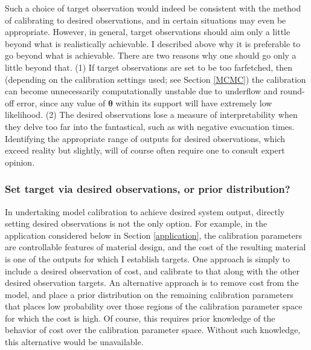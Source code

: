 \documentclass{article}
\begin{document}
Such a choice of target observation would indeed be consistent with the method of calibrating to desired observations, and in certain situations may even be appropriate. However, in general, target observations should aim only a little beyond what is realistically achievable. I described above why it is preferable to go beyond what is achievable. There are two reasons why one should go only a little beyond that. (1) If target observations are set to be too farfetched, then (depending on the calibration settings used; see Section \ref{MCMC}) the calibration can become unnecessarily computationally unstable due  to underflow and round-off error, since any value of $\boldsymbol \theta$ within its support will have extremely low likelihood.
(2) The desired observations lose a measure of interpretability when they delve too far into the fantastical, such as with negative evacuation times. Identifying the appropriate range of outputs for desired observations, which exceed reality but slightly, will of course often require one to consult expert opinion. 

\subsubsection{Set target via desired observations, or prior distribution?}
In undertaking model calibration to achieve desired system output, directly setting desired observations is not the only option. For example, in the application considered below in Section \ref{application}, the calibration parameters are controllable features of material design, and the cost of the resulting material is one of the outputs for which I establish targets. 
One approach is simply to include a desired observation of cost, and calibrate to that along with the other desired observation targets. 
An alternative approach is to remove cost from the model, and place a prior distribution on the remaining calibration parameters that places low probability over those regions of the calibration parameter space for which the cost is high. Of course, this requires prior knowledge of the behavior of cost over the calibration parameter space. Without such knowledge, this alternative would be unavailable.
\end{document}
